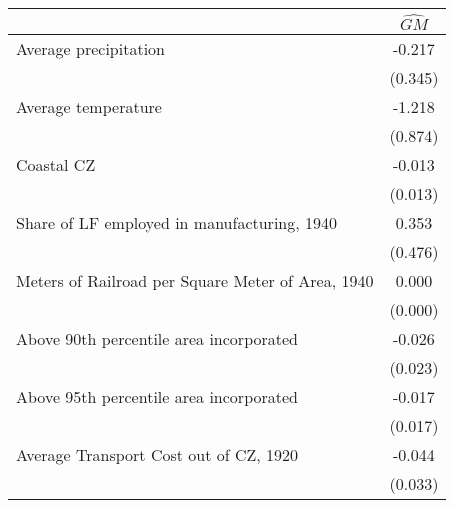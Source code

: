  \begin{tabular}{l*{1}{c}} \toprule
                &\multicolumn{1}{c}{$\widehat{GM}$}\\
\midrule
Average precipitation&   -0.217   \\
                &  (0.345)   \\
\addlinespace
Average temperature&   -1.218   \\
                &  (0.874)   \\
\addlinespace
Coastal CZ      &   -0.013   \\
                &  (0.013)   \\
\addlinespace
Share of LF employed in manufacturing, 1940&    0.353   \\
                &  (0.476)   \\
\addlinespace
Meters of Railroad per Square Meter of Area, 1940&    0.000   \\
                &  (0.000)   \\
\addlinespace
Above 90th percentile area incorporated&   -0.026   \\
                &  (0.023)   \\
\addlinespace
Above 95th percentile area incorporated&   -0.017   \\
                &  (0.017)   \\
\addlinespace
Average Transport Cost out of CZ, 1920&   -0.044   \\
                &  (0.033)   \\
 \bottomrule \end{tabular}
